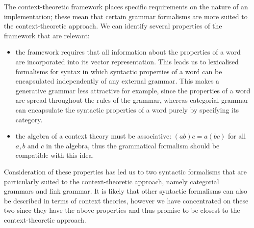 The context-theoretic framework places specific requirements on the nature of an implementation; these mean that certain grammar formalisms are more suited to the context-theoretic approach. We can identify several properties of the framework that are relevant:
\begin{itemize}
\item the framework requires that all information about the properties of a word are incorporated into its vector representation. This leads us to lexicalised formalisms for syntax in which syntactic properties of a word can be encapsulated independently of any external grammar. This makes a generative grammar less attractive for example, since the properties of a word are spread throughout the rules of the grammar, whereas categorial grammar can encapsulate the syntactic properties of a word purely by specifying its category.
\item the algebra of a context theory must be associative: $(ab)c = a(bc)$ for all $a,b$ and $c$ in the algebra, thus the grammatical formalism should be compatible with this idea.
\end{itemize}
Consideration of these properties has led us to two syntactic formalisms that are particularly suited to the context-theoretic approach, namely categorial grammars and link grammar. It is likely that other syntactic formalisms can also be described in terms of context theories, however we have concentrated on these two since they have the above properties and thus promise to be closest to the context-theoretic approach.

